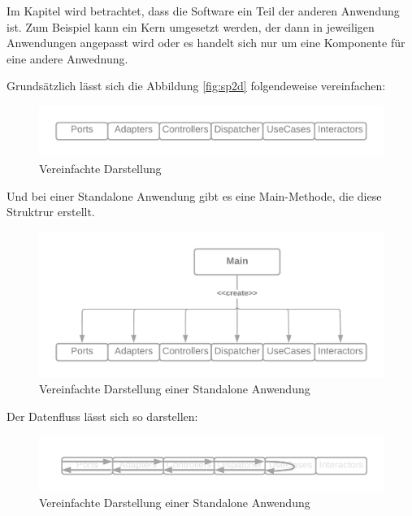Im Kapitel wird betrachtet, dass die Software ein Teil der anderen Anwendung ist.
Zum Beispiel kann ein Kern umgesetzt werden, der dann in jeweiligen Anwendungen angepasst wird 
oder es handelt sich nur um eine Komponente für eine andere Anwednung.

Grundsätzlich lässt sich die Abbildung \ref{fig:sp2d} folgendeweise vereinfachen:
\begin{figure}[H]
    \centering
    \includegraphics[width=1\textwidth]{./images/SimpliedArchitecture.png}
    \caption{Vereinfachte Darstellung}
    \label{fig:SimpliedArchitecture}
\end{figure}

Und bei einer Standalone Anwendung gibt es eine Main-Methode, die diese Struktrur erstellt.
\begin{figure}[H]
    \centering
    \includegraphics[width=1\textwidth]{./images/Architecture as Standalone.png}
    \caption{Vereinfachte Darstellung einer Standalone Anwendung}
    \label{fig:SimpliedArchitectureAsStandalone}
\end{figure}

Der Datenfluss lässt sich so darstellen:
\begin{figure}[H]
    \centering
    \includegraphics[width=1\textwidth]{./images/Dataflow.png}
    \caption{Vereinfachte Darstellung einer Standalone Anwendung}
    \label{fig:SimpliedArchitectureDataflow}
\end{figure}

